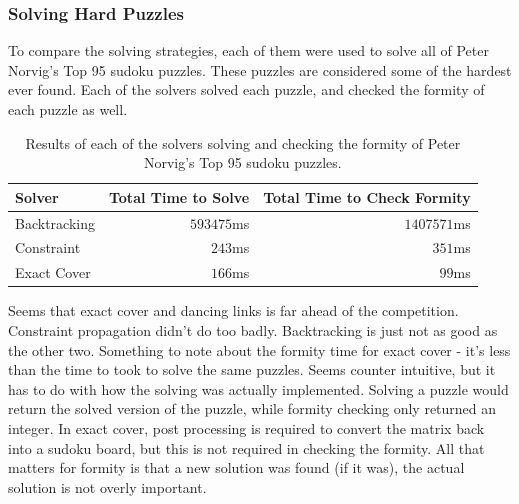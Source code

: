     \subsubsection{Solving Hard Puzzles}
    To compare the solving strategies, each of them were used to solve all of Peter Norvig's Top 95 sudoku puzzles\cite{norvig}.
    These puzzles are considered some of the hardest ever found. Each of the solvers solved each puzzle, and checked the formity
    of each puzzle as well.
    \begin{table}[H]
    \begin{center}\begin{tabular}{l|r|r}
        \hline
        Solver          &   Total Time to Solve     &   Total Time to Check Formity \\  \hline
        Backtracking    &   $593475$ms              &   $1407571$ms                 \\
        Constraint      &   $243$ms                 &   $351$ms                     \\
        Exact Cover     &   $166$ms                 &   $99$ms                      \\
        \hline
    \end{tabular}\end{center}
    \label{tab:top95}
    \caption{Results of each of the solvers solving and checking the formity of Peter Norvig's Top 95 sudoku puzzles.}
    \end{table}
    Seems that exact cover and dancing links is far ahead of the competition. Constraint propagation didn't do too badly. Backtracking
    is just not as good as the other two. Something to note about the formity time for exact cover - it's less than the time to took
    to solve the same puzzles. Seems counter intuitive, but it has to do with how the solving was actually implemented. Solving a puzzle
    would return the solved version of the puzzle, while formity checking only returned an integer. In exact cover, post processing is
    required to convert the matrix back into a sudoku board, but this is not required in checking the formity. All that matters for formity
    is that a new solution was found (if it was), the actual solution is not overly important.
    
